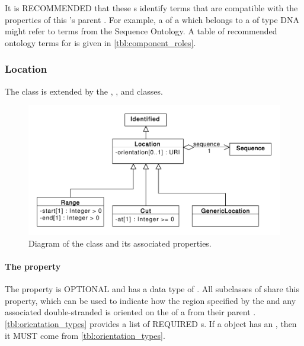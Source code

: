 It is RECOMMENDED that these  s identify terms that are compatible with the  properties of this 's parent . For example, a  of a  which belongs to a  of type DNA might refer to terms from the Sequence Ontology. A table of recommended ontology terms for  is given in \ref{tbl:component_roles}.

\subsubsection{Location}
\label{sec:Location}
The  class is extended by the , , and  classes.

\begin{figure}[ht]
\begin{center}
\includegraphics[scale=0.6]{uml/location}
\caption[]{Diagram of the  class and its associated properties.}
\label{uml:location}
\end{center}
\end{figure}

\paragraph{The  property}
\label{sec:orientation}
The  property is OPTIONAL and has a data type of . All subclasses of  share this property, which can be used to indicate how the region specified by the  and any associated double-stranded  is oriented on the  of a   from their parent . \ref{tbl:orientation_types} provides a list of REQUIRED  s. If a  object has an , then it MUST come from \ref{tbl:orientation_types}.

